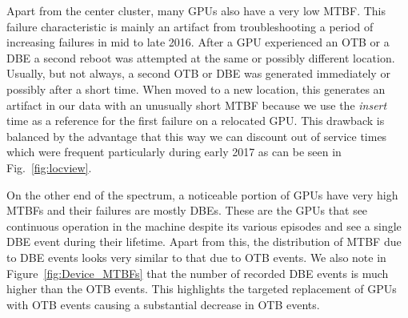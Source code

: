 Apart from the center cluster, many GPUs also have a very 
low MTBF. This failure characteristic is mainly an artifact from
troubleshooting a period of increasing failures in mid to late 2016.
After a GPU experienced an OTB or a DBE a second reboot was attempted at
the same or possibly different location. Usually, but not always, a
second OTB or DBE was generated immediately or possibly after a short
time. When moved to a new location, this generates an artifact in our
data with an unusually short MTBF because we use the {\em insert} time as
a reference for the first failure on a relocated GPU. This drawback is
balanced by the advantage that this way we can discount out of service times
which were frequent particularly during early 2017 as can be seen in
Fig.~\ref{fig:locview}.

On the other end of the spectrum, a noticeable portion of GPUs have very high
MTBFs and their failures are mostly DBEs. These are the GPUs that see continuous operation in the machine 
despite its various episodes and see a single DBE event during their lifetime.
Apart from this, the distribution of MTBF due to DBE events looks very similar to that due 
to OTB events. We also note in Figure~\ref{fig:Device_MTBFs} that the number of recorded 
DBE events is much higher than the OTB events. This highlights the targeted replacement of GPUs 
with OTB events causing a substantial decrease in OTB events.  



